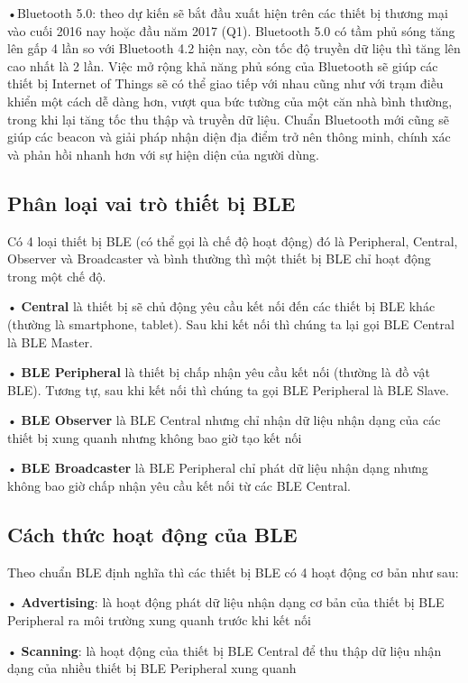 •Bluetooth 5.0: theo dự kiến sẽ bắt đầu xuất hiện trên các thiết bị thương mại vào cuối 2016 nay hoặc đầu năm 2017 (Q1). Bluetooth 5.0 có tầm phủ sóng tăng lên gấp 4 lần so với Bluetooth 4.2 hiện nay, còn tốc độ truyền dữ liệu thì tăng lên cao nhất là 2 lần. Việc mở rộng khả năng phủ sóng của Bluetooth sẽ giúp các thiết bị Internet of Things sẽ có thể giao tiếp với nhau cũng như với trạm điều khiển một cách dễ dàng hơn, vượt qua bức tường của một căn nhà bình thường, trong khi lại tăng tốc thu thập và truyền dữ liệu. Chuẩn Bluetooth mới cũng sẽ giúp các beacon và giải pháp nhận diện địa điểm trở nên thông minh, chính xác và phản hồi nhanh hơn với sự hiện diện của người dùng.

\subsection{Phân loại vai trò thiết bị BLE}
Có 4 loại thiết bị BLE (có thể gọi là chế độ hoạt động) đó là Peripheral, Central, Observer và Broadcaster và bình thường thì một thiết bị BLE chỉ hoạt động  trong một chế độ.

• \textbf{Central} là thiết bị sẽ chủ động yêu cầu kết nối đến các thiết bị BLE khác (thường là smartphone, tablet). Sau khi kết nối thì chúng ta lại gọi BLE Central là  BLE Master.

• \textbf{BLE Peripheral} là thiết bị chấp nhận yêu cầu kết nối (thường là đồ vật BLE). Tương tự, sau khi kết nối thì chúng ta gọi BLE Peripheral là BLE Slave.

• \textbf{BLE Observer} là BLE Central nhưng chỉ nhận dữ liệu nhận dạng của các thiết bị xung quanh nhưng không bao giờ tạo kết nối

• \textbf{BLE Broadcaster} là BLE Peripheral chỉ phát dữ liệu nhận dạng nhưng không bao giờ chấp nhận yêu cầu kết nối từ các BLE Central.
 
\subsection{Cách thức hoạt động của BLE}
Theo chuẩn BLE định nghĩa thì các thiết bị BLE có 4 hoạt động cơ bản như sau: \cite{hte}

• \textbf{Advertising}: là hoạt động phát dữ liệu nhận dạng cơ bản của thiết bị BLE Peripheral ra môi trường xung quanh trước khi kết nối

• \textbf{Scanning}: là hoạt động của thiết bị BLE Central để thu thập dữ liệu nhận dạng của nhiều thiết bị BLE Peripheral xung quanh

